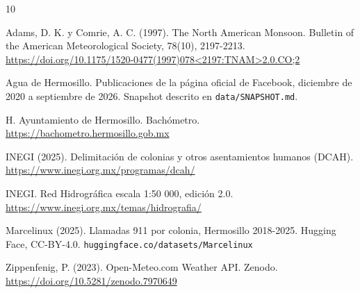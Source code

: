 \documentclass[11pt]{article}
\begin{document}
\begin{thebibliography}{10}
\raggedright

Adams, D. K. y Comrie, A. C. (1997). The North American Monsoon. Bulletin of the American Meteorological Society, 78(10), 2197-2213. \url{https://doi.org/10.1175/1520-0477(1997)078<2197:TNAM>2.0.CO;2}

Agua de Hermosillo. Publicaciones de la página oficial de Facebook, diciembre de 2020 a septiembre de 2026. Snapshot descrito en \texttt{data/SNAPSHOT.md}.

H. Ayuntamiento de Hermosillo. Bachómetro. \url{https://bachometro.hermosillo.gob.mx}

INEGI (2025). Delimitación de colonias y otros asentamientos humanos (DCAH). \url{https://www.inegi.org.mx/programas/dcah/}

INEGI. Red Hidrográfica escala 1:50 000, edición 2.0. \url{https://www.inegi.org.mx/temas/hidrografia/}

Marcelinux (2025). Llamadas 911 por colonia, Hermosillo 2018-2025. Hugging Face, CC-BY-4.0. \texttt{huggingface.co/datasets/Marcelinux}

Zippenfenig, P. (2023). Open-Meteo.com Weather API. Zenodo. \url{https://doi.org/10.5281/zenodo.7970649}

\end{thebibliography}
\end{document}
